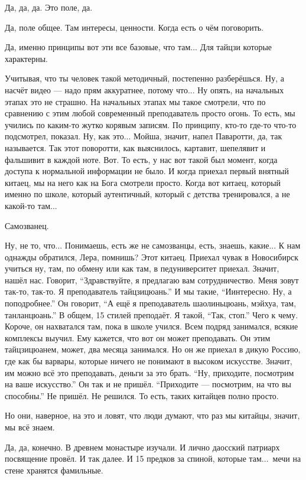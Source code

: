\I
Да, да, да. Это поле, да.

\A
Да, поле общее. Там интересы,
ценности. Когда есть
о чём поговорить.

\I
Да, именно принципы вот эти все
базовые, что там...
Для тайцзи которые характерны.

\A
Учитывая, что ты человек
такой методичный,
постепенно разберёшься.
Ну, а насчёт видео --- надо
прям аккуратнее, потому что...
Ну
опять, на начальных этапах это не страшно.
На начальных этапах
мы такое смотрели, что
по сравнению с этим любой
современный преподаватель
просто огонь.
То есть, мы учились по каким-то жутко корявым
записям.
По принципу, кто-то где-то что-то
подсмотрел, показал.
Ну, как это...
Мойша,
значит, напел
Паваротти, да, так называется.
Так этот поворотти, как выяснилось,
картавит, шепелявит
и фальшивит в каждой ноте.
Вот. То есть, у нас вот такой
был момент, когда доступа
к нормальной информации не было.
И когда приехал первый внятный
китаец, мы на него как на Бога смотрели
просто. Когда вот китаец,
который именно по школе,
который аутентичный, который
с детства тренировался, а не какой-то там...

\I
Самозванец.

\A
Ну, не то, что... Понимаешь, есть же не самозванцы,
есть, знаешь, какие...
К нам однажды обратился, Лера, помнишь?
Этот китаец. Приехал
чувак в Новосибирск
учиться
ну, там, по обмену
или как там, в
педуниверситет приехал.
Значит, нашёл нас.
Говорит, ``Здравствуйте, я
предлагаю вам сотрудничество.
Меня зовут так-то, так-то.
Я преподаватель тайцзицюань.''
И мы такие, ``Иинтересно.
Ну, а поподробнее.''
Он говорит, ``А ещё я преподаватель шаолиньцюань, мэйхуа, там,
танланцюань.'' В общем, 15
стилей преподаёт.
Я такой, ``Так, стоп.''
Чего к чему. Короче,
он нахватался там, пока
в школе учился.
Всем подряд занимался, всякие
комплексы выучил.
Ему кажется, что вот он
может преподавать.
Он этим тайцзицюанем, может, два месяца
занимался. Но он же приехал в
дикую Россию, где
как бы варвары, которые
ничего не понимают в высоком искусстве.
Значит, им можно
всё это преподавать, деньги
за это брать. ``Ну, приходите, посмотрим
на ваше искусство.'' Он так и не
пришёл. ``Приходите ---
посмотрим, на что вы способны.''
Не пришёл. Не решился.
То есть, таких китайцев
полно просто.

\I
Но они, наверное, на это и
ловят, что люди думают,
что раз мы китайцы, значит, мы всё знаем.

\A
Да, да, конечно.
В древнем монастыре изучали.
И лично даосский
патриарх посвящение
провёл.
И так далее. И 15 предков
за спиной, которые там...\ мечи
на стене хранятся фамильные.

